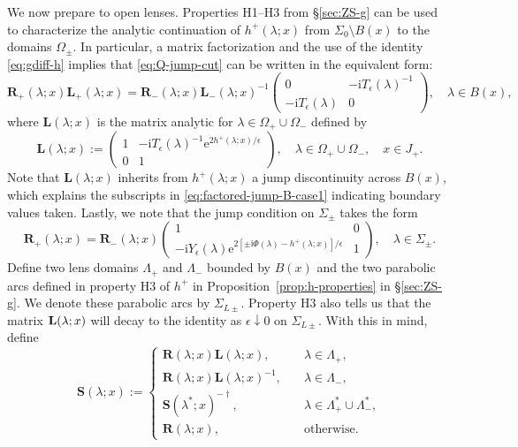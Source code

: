 \documentclass[12pt]{amsart}
\numberwithin{equation}{section}
\newcommand{\ee}{\mathrm{e}}
\newcommand{\ii}{\mathrm{i}}
\newcommand{\SP}{\lambda}
\newcommand{\phaseint}{\Phi}
\def\eq{\begin{equation}}
\def\endeq{\end{equation}}
\begin{document}
We now prepare to open lenses.  Properties H1--H3 from \S\ref{sec:ZS-g} can 
be used to characterize the analytic continuation of $h^+(\SP;x)$
from $\Sigma_0\setminus B(x)$ to the domains $\Omega_\pm$.
In particular, a matrix factorization and the use of the identity \eqref{eq:gdiff-h} implies that 
\eqref{eq:Q-jump-cut} can be written in the equivalent form:
\eq
\mathbf{R}_+(\SP;x)\mathbf{L}_+(\SP;x)=
\mathbf{R}_-(\SP;x)\mathbf{L}_-(\SP;x)^{-1}
\begin{pmatrix}0 & -\ii T_\epsilon(\SP)^{-1}
\\
-\ii T_\epsilon(\SP)
& 0 \end{pmatrix}, \quad \SP\in B(x),
\label{eq:factored-jump-B-case1}
\endeq
where $\mathbf{L}(\SP;x)$ is the matrix analytic for $\SP\in\Omega_+\cup\Omega_-$ defined by
\eq
\mathbf{L}(\SP;x):=
\begin{pmatrix} 1 & -\ii T_\epsilon(\SP)^{-1}\ee^{2h^+(\SP;x)/\epsilon} \\ 0 & 1 \end{pmatrix}
, \quad  \SP\in \Omega_+\cup\Omega_-,\quad x\in J_+.
\label{eq:L-define-case1}
\endeq
Note that $\mathbf{L}(\SP;x)$ inherits from $h^+(\SP;x)$ a jump discontinuity across $B(x)$, which explains the subscripts in \eqref{eq:factored-jump-B-case1} indicating boundary values taken.  Lastly, we note that the jump condition on $\Sigma_\pm$ takes the form
\begin{equation}
\mathbf{R}_+(\SP;x)=\mathbf{R}_-(\SP;x) \begin{pmatrix} 1 & 0 \\ 
-\ii Y_\epsilon(\SP)\ee^{2[\pm \ii\phaseint(\SP)-h^+(\SP;x)]/\epsilon} & 1 \end{pmatrix}
,\quad\SP\in\Sigma_\pm.
\label{eq:jump-outer-lens-1}
\end{equation}
Define two lens domains $\Lambda_+$ and $\Lambda_-$ bounded by $B(x)$ and the 
two parabolic arcs defined in property H3 of $h^+$ in 
Proposition~\ref{prop:h-properties} in \S\ref{sec:ZS-g}.  We denote these 
parabolic arcs by $\Sigma_{L\pm}$.  Property H3 also 
tells us that the matrix ${\bf L}(\SP;x)$ will decay to the identity as 
$\epsilon\downarrow 0$ on $\Sigma_{L\pm}$.  With this in mind, define 
\begin{equation}
\mathbf{S}(\SP;x):=\begin{cases}
\mathbf{R}(\SP;x)\mathbf{L}(\SP;x),&\quad \SP\in\Lambda_+,\\
\mathbf{R}(\SP;x)\mathbf{L}(\SP;x)^{-1},&\quad\SP\in\Lambda_-,\\
\mathbf{S}(\SP^*;x)^{-\dagger},&\quad\SP\in\Lambda_+^*\cup\Lambda_-^*,\\
\mathbf{R}(\SP;x),&\quad \text{otherwise.}
\end{cases}
\label{eq:S-define-3}
\end{equation}
\end{document}
